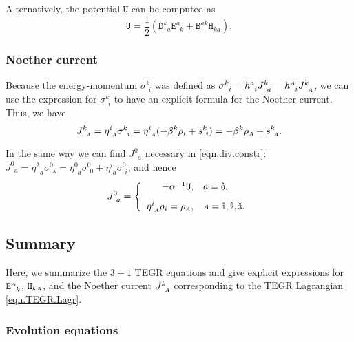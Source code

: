\documentclass[
10pt, %
a4paper, %
oneside, %
headinclude,footinclude, %
BCOR5mm, %
]{scrartcl}
\newcommand{\sA}{\mathsmaller A}
\newcommand{\tetrsymbol}{h}
\newcommand{\itetrsymbol}{\eta}
\newcommand{\itetr}[2]{\itetrsymbol^{#1}_{\phantom{#1}#2}}
\newcommand{\tetr}[2]{\tetrsymbol^{#1}_{\phantom{#1}#2}}
\newcommand{\stress}[2]{s_{\ #1}^{#2}}
\newcommand{\Dfin}[2]{\mathtt{D}_{\phantom{#2}#1}^{#2}}	%
\newcommand{\Hfin}[2]{\mathtt{H}_{#2#1}}	%
\newcommand{\Efin}[2]{\mathtt{E}^{#1}_{\phantom{#1}#2}}	%
\newcommand{\Ufin}{\mathtt{U}}
\newcommand{\Bfin}[2]{\mathtt{B}^{#1#2}}	%
\newcommand{\EMmat}[2]{\sigma^{#1}_{\ \,#2}}
\newcommand{\NC}[2]{J^{#2}_{\phantom{#2}#1}}
\newcommand{\indalg}[1]{\hat{\mathsmaller{#1}}}
\newcommand{\shift}[1]{\beta^{#1}}
\begin{document}
Alternatively, the potential $ \Ufin$ can be computed as
\begin{equation}\label{eqn.U.bdeh}
	\Ufin = \frac{1}{2} ( \Dfin{a}{k} \Efin{a}{k} + \Bfin{a}{k} \Hfin{a}{k} ).
\end{equation} 

\subsubsection{Noether current}

Because the energy-momentum $ \EMmat{k}{i} $ was defined as $ \EMmat{k}{i} = \tetr{a}{i} 
\NC{a}{k} = \tetr{\sA}{i} \NC{\sA}{k} $, we can use the expression for $ \EMmat{k}{i} $ to have an 
explicit formula for the Noether current. Thus, we have
\begin{equation}\label{eqn.J.new}
	\NC{\sA}{k} = \itetr{i}{\sA} \EMmat{k}{i} = \itetr{i}{\sA} (-\shift{k} \rho_i + \stress{i}{k} ) 
	= 
	-\shift{k} \rho_{\sA} + \stress{\sA}{k}.
\end{equation}

In the same way we can find $ \NC{a}{0} $ necessary in \eqref{eqn.div.constr}: $ \NC{a}{0} = 
\itetr{\lambda}{a} \EMmat{0}{\lambda} = \itetr{0}{a} \EMmat{0}{0} + \itetr{i}{a} \EMmat{0}{i}$, and 
hence
\begin{equation}\label{eqn.Ja0}
	\NC{a}{0} = \left\{
	\begin{array}{rl}
		-\alpha^{-1} \Ufin,	& a=\indalg{0},  \\[3mm] 
		\itetr{i}{\sA} \rho_i = \rho_{\sA}, & \sA=\indalg{1},\indalg{2},\indalg{3}. \\ 
	\end{array} 
	\right.
\end{equation}




\subsection{Summary}
Here, we summarize the $ 3+1 $ TEGR equations and give explicit expressions for $ \Efin{\sA}{k} $, 
$ \Hfin{\sA}{k} $, and the Noether current $ \NC{\sA}{k} $ corresponding to the TEGR Lagrangian 
\eqref{eqn.TEGR.Lagr}.


\subsubsection{Evolution equations}
\end{document}
